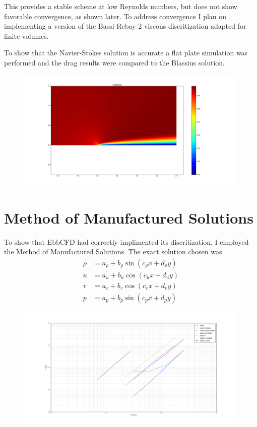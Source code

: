 \documentclass[12pt,parskip=full]{article}
\numberwithin{subsection}{section}
\begin{document}
		
		This provides a stable scheme at low Reynolds numbers, but does not show favorable convergence, as shown later. To address convergence I plan
		on implementing a version of the Bassi-Rebay 2 viscous discritization adapted for finite volumes.

		To show that the Navier-Stokes solution is accurate a flat plate simulation was performed and the drag results were compared to the
		Blassius solution.

		\begin{figure}[H]
			\includegraphics[width=\textwidth]{FlatPlate.pdf}
		\end{figure}
		
	\section{Method of Manufactured Solutions}
		To show that EbbCFD had correctly implimented its discritization, I employed the Method of Manufactured Solutions.
		The exact solution chosen was
		\begin{align}
			\rho &= a_\rho + b_\rho \sin(c_\rho x + d_\rho y) \\
			u &= a_u + b_u \cos(c_u x + d_u y) \\
			v &= a_v + b_v \cos(c_v x + d_v y) \\
			p &= a_p + b_p \sin(c_p x + d_p y)
		\end{align}

		\begin{figure}[H]
			\includegraphics[width=\textwidth]{ConvergencePlot.pdf}
		\end{figure}
\end{document}
